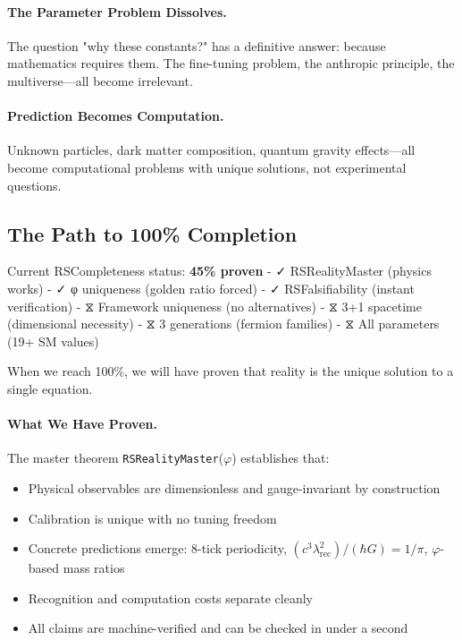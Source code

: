 \documentclass[11pt,a4paper,twoside]{article}
\numberwithin{equation}{section}
\theoremstyle{customthm}
\theoremstyle{customdef}
\theoremstyle{customrem}
\begin{document}
\paragraph{The Parameter Problem Dissolves.} The question "why these constants?" has a definitive answer: because mathematics requires them. The fine-tuning problem, the anthropic principle, the multiverse—all become irrelevant.

\paragraph{Prediction Becomes Computation.} Unknown particles, dark matter composition, quantum gravity effects—all become computational problems with unique solutions, not experimental questions.

\subsection{The Path to 100\% Completion}

Current RSCompleteness status: \textbf{45\% proven}
- ✓ RSRealityMaster (physics works)
- ✓ φ uniqueness (golden ratio forced)
- ✓ RSFalsifiability (instant verification)
- ⧖ Framework uniqueness (no alternatives)
- ⧖ 3+1 spacetime (dimensional necessity)
- ⧖ 3 generations (fermion families)
- ⧖ All parameters (19+ SM values)

When we reach 100\%, we will have proven that reality is the unique solution to a single equation.

\paragraph{What We Have Proven.} The master theorem \texttt{RSRealityMaster}($\varphi$) establishes that:
\begin{itemize}[leftmargin=*,topsep=2pt,itemsep=2pt]
\item Physical observables are dimensionless and gauge-invariant by construction
\item Calibration is unique with no tuning freedom
\item Concrete predictions emerge: 8-tick periodicity, $(c^3\lambda_{\mathrm{rec}}^2)/(\hbar G) = 1/\pi$, $\varphi$-based mass ratios
\item Recognition and computation costs separate cleanly
\item All claims are machine-verified and can be checked in under a second
\end{itemize}
\end{document}
